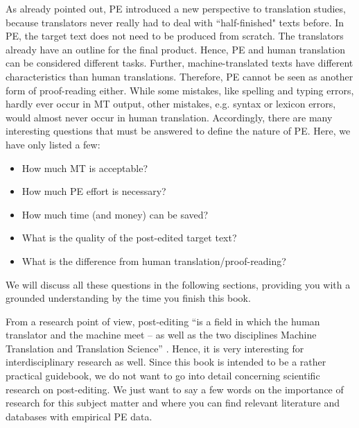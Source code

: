 
As \cite{allen_post-editing_2003} already pointed out, PE introduced a new perspective to translation studies, because translators never really had to deal with ``half-finished" texts before. In PE, the target text does not need to be produced from scratch. The translators already have an outline for the final product. Hence, PE and human translation can be considered different tasks. Further, machine-translated texts have different characteristics than human translations. Therefore, PE cannot be seen as another form of proof-reading either. While some mistakes, like spelling and typing errors, hardly ever occur in MT output, other mistakes, e.g. syntax or lexicon errors, would almost never occur in human translation. Accordingly, there are many interesting questions that must be answered to define the nature of PE. Here, we have only listed a few:
\begin{itemize}
    \item How much MT is acceptable?
    \item How much PE effort is necessary?
    \item How much time (and money) can be saved?
    \item What is the quality of the post-edited target text?
    \item What is the difference from human translation/proof-reading?
\end{itemize}
We will discuss all these questions in the following sections, providing you with a grounded understanding by the time you finish this book.

\bigskip

From a research point of view, post-editing “is a field in which the human translator and the machine meet – as well as the two disciplines Machine Translation and Translation Science” \citep[35]{culo_influence_2014}. Hence, it is very interesting for interdisciplinary research as well. 
Since this book is intended to be a rather practical guidebook, we do not want to go into detail concerning scientific research on post-editing. We just want to say a few words on the importance of research for this subject matter and where you can find relevant literature and databases with empirical PE data.

